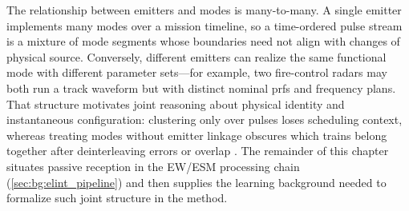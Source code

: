 The relationship between emitters and modes is many-to-many.
A single emitter implements many modes over a mission timeline, so a time-ordered pulse stream is a mixture of mode segments whose boundaries need not align with changes of physical source.
Conversely, different emitters can realize the same functional mode with different parameter sets---for example, two fire-control radars may both run a track waveform but with distinct nominal \glspl{prf} and frequency plans.
That structure motivates joint reasoning about physical identity and instantaneous configuration: clustering only over pulses loses scheduling context, whereas treating modes without emitter linkage obscures which trains belong together after deinterleaving errors or overlap \parencite{wiley2006elint}.
The remainder of this chapter situates passive reception in the EW/ESM processing chain (\cref{sec:bg:elint_pipeline}) and then supplies the learning background needed to formalize such joint structure in the method.

